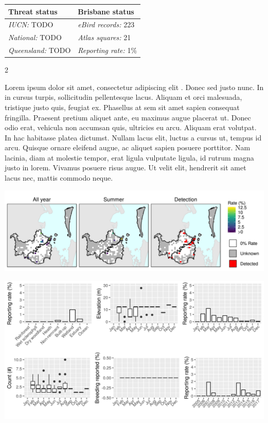 \documentclass[12pt,openany,oneside]{book}
\let\origfigure\figure
\let\endorigfigure\endfigure
\renewenvironment{figure}[1][2] {
  \expandafter\origfigure\expandafter[H]
} {
  \endorigfigure
}
\let\Begin\begin
\let\End\end
\theoremstyle{definition}
\theoremstyle{definition}
\theoremstyle{definition}
\theoremstyle{remark}
\begin{document}
\begin{tabu} to 
\toprule
Threat status & Brisbane status\\
\midrule
\textit{IUCN:} TODO & \textit{eBird records:} 223\\
\textit{National:} TODO & \textit{Atlas squares:} 21\\
\textit{Queensland:} TODO & \textit{Reporting rate:} 1\%\\
\bottomrule
\end{tabu} 
\vspace{0.15cm}

\Begin{multicols}{2}

Lorem ipsum dolor sit amet, consectetur adipiscing elit
\citep{rexample1, rexample2, rexample3}. Donec sed justo nunc. In in
cursus turpis, sollicitudin pellentesque lacus. Aliquam et orci
malesuada, tristique justo quis, feugiat ex. Phasellus at sem sit amet
sapien consequat fringilla. Praesent pretium aliquet ante, eu maximus
augue placerat ut. Donec odio erat, vehicula non accumsan quis,
ultricies eu arcu. Aliquam erat volutpat. In hac habitasse platea
dictumst. Nullam lacus elit, luctus a cursus ut, tempus id arcu. Quisque
ornare eleifend augue, ac aliquet sapien posuere porttitor. Nam lacinia,
diam at molestie tempor, erat ligula vulputate ligula, id rutrum magna
justo in lorem. Vivamus posuere risus augue. Ut velit elit, hendrerit
sit amet lacus nec, mattis commodo neque.

\End{multicols}

\clearpage

\begin{figure}
\centering
\includegraphics[height=0.47\textheight,width=\textwidth,keepaspectratio=true]{assets/maps/Spatula-rhynchotis.png}
\end{figure}

\begin{figure}
\centering
\includegraphics[height=0.47\textheight,width=\textwidth,keepaspectratio=true]{assets/graphs/Spatula-rhynchotis.png}
\end{figure}
\end{document}
